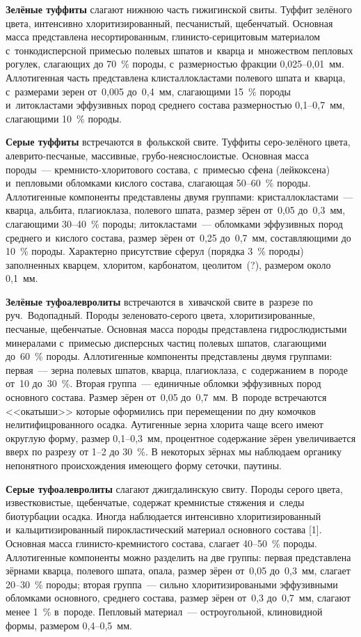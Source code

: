 \textbf{Зелёные туффиты} слагают нижнюю часть гижигинской свиты. Туффит зелёного цвета, интенсивно хлоритизированный, песчанистый, щебенчатый. Основная масса представлена несортированным, глинисто-серицитовым материалом с~тонкодисперсной примесью полевых шпатов и~кварца и~множеством пепловых рогулек, слагающих до 70~\% породы, с~размерностью фракции 0,025--0,01~мм. Аллотигенная часть представлена клисталлокластами полевого шпата и~кварца, с~размерами зерен от~0,005 до~0,4~мм, слагающими 15~\% породы и~литокластами эффузивных пород среднего состава размерностью 0,1--0,7~мм, слагающими 10~\% породы.

\textbf{Серые туффиты} встречаются в~фолькской свите. Туффиты серо-зелёного цвета, алеврито-песчаные, массивные, грубо-неяснослоистые. Основная масса породы~--- крем\-ни\-сто-хло\-ри\-то\-во\-го состава, с~примесью сфена (лейкоксена) и~пепловыми обломками кислого состава, слагающая 50--60~\% породы. Аллотигенные компоненты представлены двумя группами: кристаллокластами~--- кварца, альбита, плагиоклаза, полевого шпата, размер зёрен от~0,05 до~0,3~мм, слагающими 30--40~\% породы; литокластами~--- обломками эффузивных пород среднего и~кислого состава, размер зёрен от~0,25 до~0,7~мм, составляющими до 10~\% породы. Характерно присутствие сферул (порядка 3~\% породы) заполненных кварцем, хлоритом, карбонатом, цеолитом~(?), размером около 0,1~мм.

\textbf{Зелёные туфоалевролиты} встречаются в~хивачской свите в~разрезе по руч.~Водопадный. Породы зеленовато-серого цвета, хлоритизированные, песчаные, щебенчатые. Основная масса породы представлена гидрослюдистыми минералами с~примесью дисперсных частиц полевых шпатов, слагающими до~60~\% породы. Аллотигенные компоненты представлены двумя группами: первая~--- зерна полевых шпатов, кварца, плагиоклаза, с~содержанием в~породе от~10 до~30~\%. Вторая группа~--- единичные обломки эффузивных пород основного состава. Размер зёрен от~0,05 до~0,7~мм. В~породе встречаются <<окатыши>> которые оформились при перемещении по дну комочков нелитифицрованного осадка. Аутигенные зерна хлорита чаще всего имеют округлую форму, размер 0,1--0,3~мм, процентное содержание зёрен увеличивается вверх по разрезу от 1--2 до 30~\%. В некоторых зёрнах мы наблюдаем органику непонятного происхождения имеющего форму сеточки, паутины.

\textbf{Серые туфоалевролиты} слагают джигдалинскую свиту. Породы серого цвета, известковистые, щебенчатые, содержат кремнистые стяжения и~следы биотурбации осадка. Иногда наблюдается интенсивно хлоритизированный и~кальцитизированный пирокластический материал основного состава [1]. Основная масса глинисто-кремнистого состава, слагает 40--50~\% породы. Аллотигенные компоненты можно разделить на две группы: первая представлена зёрнами кварца, полевого шпата, опала, размер зёрен от~0,05 до~0,3~мм, слагает 20--30~\% породы; вторая группа~--- сильно хлоритизироваными эффузивными обломками основного, среднего состава, размер зёрен от~0,3 до~0,7~мм, слагают менее 1~\% в~породе. Пепловый материал~--- остроугольной, клиновидной формы, размером 0,4--0,5~мм.


